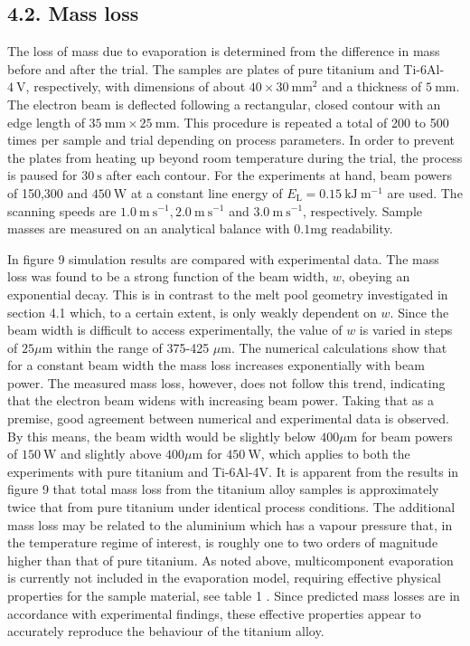 \documentclass[10pt]{article}
\begin{document}
\subsection*{4.2. Mass loss}
The loss of mass due to evaporation is determined from the difference in mass before and after the trial. The samples are plates of pure titanium and Ti-6Al- $4 \mathrm{~V}$, respectively, with dimensions of about $40 \times 30 \mathrm{~mm}^{2}$ and a thickness of $5 \mathrm{~mm}$. The electron beam is deflected following a rectangular, closed contour with an edge length of $35 \mathrm{~mm} \times 25 \mathrm{~mm}$. This procedure is repeated a total of 200 to 500 times per sample and trial depending on process parameters. In order to prevent the plates from heating up beyond room temperature during the trial, the process is paused for $30 \mathrm{~s}$ after each contour. For the experiments at hand, beam powers of 150,300 and $450 \mathrm{~W}$ at a constant line energy of $E_{\mathrm{L}}=0.15 \mathrm{~kJ} \mathrm{~m}^{-1}$ are used. The scanning speeds are $1.0 \mathrm{~m} \mathrm{~s}^{-1}, 2.0 \mathrm{~m} \mathrm{~s}^{-1}$ and $3.0 \mathrm{~m} \mathrm{~s}^{-1}$, respectively. Sample masses are measured on an analytical balance with $0.1 \mathrm{mg}$ readability.

In figure 9 simulation results are compared with experimental data. The mass loss was found to be a strong function of the beam width, $w$, obeying an exponential decay. This is in contrast to the melt pool geometry investigated in section 4.1 which, to a certain extent, is only weakly dependent on $w$. Since the beam width is difficult to access experimentally, the value of $w$ is varied in steps of $25 \mu \mathrm{m}$ within the range of 375-425 $\mu \mathrm{m}$. The numerical calculations show that for a constant beam width the mass loss increases exponentially with beam power. The measured mass loss, however, does not follow this trend, indicating that the electron beam widens with increasing beam power. Taking that as a premise, good agreement between numerical and experimental data is observed. By this means, the beam width would be slightly below $400 \mu \mathrm{m}$ for beam powers of $150 \mathrm{~W}$ and slightly above $400 \mu \mathrm{m}$ for $450 \mathrm{~W}$, which applies to both the experiments with pure titanium and Ti-6Al-4V. It is apparent from the results in figure 9 that total mass loss from the titanium alloy samples is approximately twice that from pure titanium under identical process conditions. The additional mass loss may be related to the aluminium which has a vapour pressure that, in the temperature regime of interest, is roughly one to two orders of magnitude higher than that of pure titanium. As noted above, multicomponent evaporation is currently not included in the evaporation model, requiring effective physical properties for the sample material, see table 1 . Since predicted mass losses are in accordance with experimental findings, these effective properties appear to accurately reproduce the behaviour of the titanium alloy.
\end{document}
